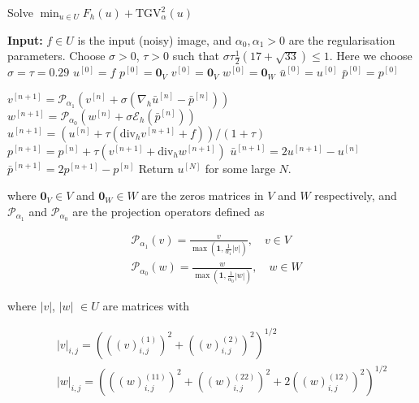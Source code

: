 \begin{algorithm}[H]
    \caption{Solve $\min_{u \in U} F_h(u) + \mathrm{TGV}^2_{\alpha}(u)$}

    \begin{algorithmic}[1]
    \STATE \textbf{Input:} $f \in U$ is the input (noisy) image, and $\alpha_0, \alpha_1 > 0$ are the regularisation parameters.
    \STATE Choose $\sigma > 0$, $\tau > 0$ such that $\sigma \tau \frac{1}{2} (17 + \sqrt{33}) \leq 1$. Here we choose $\sigma = \tau = 0.29$
    \STATE $u^{[0]} = f$
    \STATE $p^{[0]} = \mathbf{0}_V$
    \STATE $v^{[0]} = \mathbf{0}_V$
    \STATE $w^{[0]} = \mathbf{0}_W$
    \STATE $\bar{u}^{[0]} = u^{[0]}$
    \STATE $\bar{p}^{[0]} = p^{[0]}$

            \STATE $v^{[n+1]} = \mathcal{P}_{\alpha_1} \left( v^{[n]} + \sigma (\nabla_h \bar{u}^{[n]} - \bar{p}^{[n]}) \right)$
            \STATE $w^{[n+1]} = \mathcal{P}_{\alpha_0} \left( w^{[n]} + \sigma \mathcal{E}_h (\bar{p}^{[n]}) \right)$
            \STATE $u^{[n+1]} = \left( u^{[n]} + \tau (\text{div}_h v^{[n+1]} + f) \right) / ( 1 + \tau )$
            \STATE $p^{[n+1]} = p^{[n]} + \tau (v^{[n+1]} + \text{div}_h w^{[n+1]})$
            \STATE $\bar{u}^{[n+1]} = 2u^{[n+1]} - u^{[n]}$
            \STATE $\bar{p}^{[n+1]} = 2p^{[n+1]} - p^{[n]}$
    \ENDFOR
    \STATE Return $u^{[N]}$ for some large $N$.

    \end{algorithmic}
    \label{alg:pdhg_tgv_scalar}
\end{algorithm}

where $\mathbf{0}_V \in V$ and $\mathbf{0}_W \in W$ are the zeros matrices in $V$ and $W$ respectively, and $\mathcal{P}_{\alpha_1}$ and $\mathcal{P}_{\alpha_0}$ are the projection operators defined as

\begin{equation}
    \begin{aligned}
    & \mathcal{P}_{\alpha_1}(v) = \frac{v}{\max \left(\mathbf{1}, \frac{1}{\alpha_1}|v|\right)}, \quad v \in V \\
    & \mathcal{P}_{\alpha_0}(w) = \frac{w}{\max \left(\mathbf{1}, \frac{1}{\alpha_0}|w|\right)}, \quad w \in W
    \end{aligned}
\end{equation}

where $|v|$, $|w|$ $\in U$ are matrices with

\begin{equation}
    \begin{aligned}
   \quad &|v|_{i,j} = \left( \left( (v)_{i,j}^{(1)} \right)^{2} + \left( (v)_{i,j}^{(2)} \right)^{2} \right)^{1/2} \\
    \quad &|w|_{i,j} = \left( \left( (w)_{i,j}^{(11)} \right)^{2} + \left( (w)_{i,j}^{(22)} \right)^{2} + 2 \left( (w)_{i,j}^{(12)} \right)^{2} \right)^{1/2}
    \end{aligned}
    \label{eq:abs_v_w}
\end{equation}

